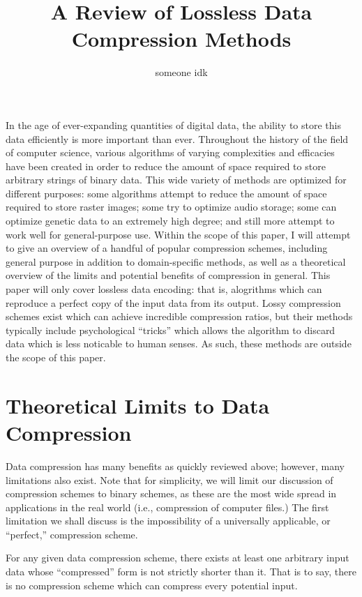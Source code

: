 \documentclass[12pt]{article}
\title{A Review of Lossless Data Compression Methods}
\author{someone idk}
\begin{document}
\maketitle

In the age of ever-expanding quantities of digital data, the ability
to store this data efficiently is more important than ever. Throughout
the history of the field of computer science, various algorithms of
varying complexities and efficacies have been created in order to
reduce the amount of space required to store arbitrary strings of
binary data. This wide variety of methods are optimized for different
purposes: some algorithms attempt to reduce the amount of space
required to store raster images; some try to optimize audio storage;
some can optimize genetic data to an extremely high degree; and still
more attempt to work well for general-purpose use. Within the scope of
this paper, I will attempt to give an overview of a handful of popular
compression schemes, including general purpose in addition to
domain-specific methods, as well as a theoretical overview of the
limits and potential benefits of compression in general. This paper
will only cover lossless data encoding: that is, alogrithms which can
reproduce a perfect copy of the input data from its output. Lossy
compression schemes exist which can achieve incredible compression
ratios, but their methods typically include psychological ``tricks''
which allows the algorithm to discard data which is less noticable to
human senses. As such, these methods are outside the scope of this
paper.

\section{Theoretical Limits to Data Compression}

Data compression has many benefits as quickly reviewed above; however,
many limitations also exist. Note that for simplicity, we will limit
our discussion of compression schemes to binary schemes, as these are
the most wide spread in applications in the real world (i.e.,
compression of computer files.) The first limitation we shall discuss
is the impossibility of a universally applicable, or ``perfect,''
compression scheme.

\begin{Theorem}
  \label{imperfect-compression}
  For any given data compression scheme, there exists at least one
  arbitrary input data whose ``compressed'' form is not strictly
  shorter than it. That is to say, there is no compression scheme
  which can compress every potential input.
\end{Theorem}
\end{document}
